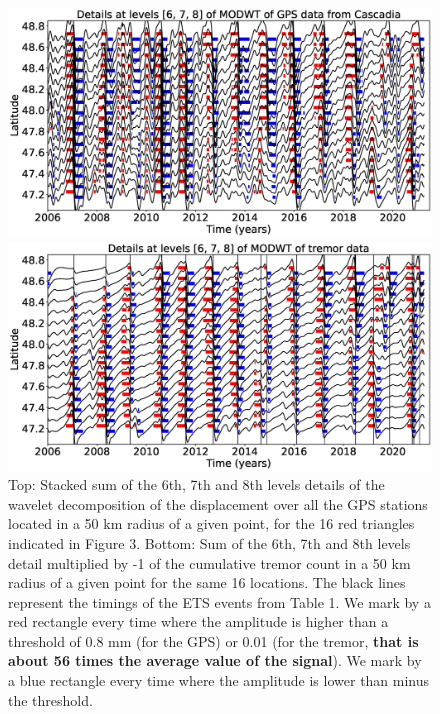 \documentclass{article}
\begin{document}
\begin{figure}
\noindent\includegraphics[width=\textwidth, trim={0cm 0cm 0cm 0cm},clip]{figures/GPS_longer_details_6-7-8.eps}

\noindent\includegraphics[width=\textwidth, trim={0cm 0cm 0cm 0cm},clip]{figures/tremor_longer_detail_6-7-8.eps}
\caption{Top: Stacked sum of the 6th, 7th and 8th levels details of the wavelet decomposition of the displacement over all the GPS stations located in a 50 km radius of a given point, for the 16 red triangles indicated in Figure 3. Bottom: Sum of the 6th, 7th and 8th levels detail multiplied by -1 of the cumulative tremor count in a 50 km radius of a given point for the same 16 locations. The black lines represent the timings of the ETS events from Table 1. We mark by a red rectangle every time where the amplitude is higher than a threshold of 0.8 mm (for the GPS) or 0.01 (for the tremor, \textbf{that is about 56 times the average value of the signal}). We mark by a blue rectangle every time where the amplitude is lower than minus the threshold.}
\label{pngfiguresample}
\end{figure}
\end{document}

